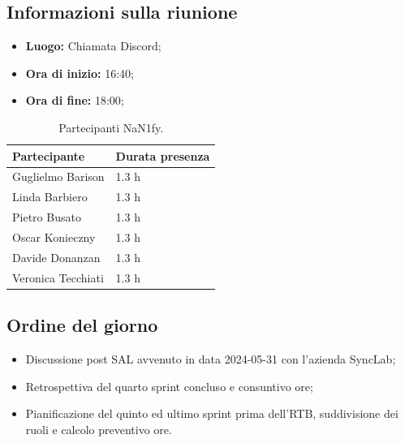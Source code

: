 \documentclass[8pt]{article}
\begin{document}
\subsection{Informazioni sulla riunione}
\begin{itemize}
	\setlength\itemsep{0em}
	\item\textbf{Luogo:} Chiamata Discord;
	\item\textbf{Ora di inizio:} 16:40;
  \item\textbf{Ora di fine:}  18:00;
\end{itemize}
\begin{table}[ht!]
	\begin{minipage}[t]{0.5\linewidth}
		\centering
		\begin{tabular}{p{3cm} p{3cm}}
			\toprule
			\textbf{Partecipante} & \textbf{Durata presenza} \\
			\midrule
			Guglielmo Barison & 1.3 h \\
			Linda Barbiero &  1.3 h \\
			Pietro Busato & 1.3 h \\
			Oscar Konieczny & 1.3 h \\
			Davide Donanzan & 1.3 h \\
			Veronica Tecchiati & 1.3 h \\
			\bottomrule
		\end{tabular}
		\caption{Partecipanti NaN1fy.}
		\label{table:Partecipanti NaN1fy}
	\end{minipage} 
\end{table}
\subsection{Ordine del giorno}
\begin{itemize}
	\setlength\itemsep{0em}
    \item Discussione post SAL avvenuto in data 2024-05-31 con l'azienda SyncLab;
    \item Retrospettiva del quarto sprint concluso e consuntivo ore;
	\item Pianificazione del quinto ed ultimo sprint prima dell'RTB, suddivisione dei ruoli e calcolo preventivo ore.
\end{itemize}
\end{document}
